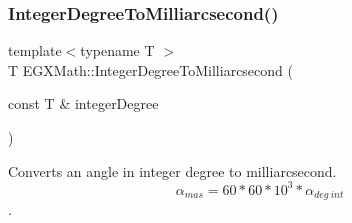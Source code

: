 \mbox{\label{group___e_g_x_math-_angle_conversions-_integer_degree_gadc43f22e832cd8fcf16b7bd2269ae348}} 
\subsubsection{\texorpdfstring{Integer\+Degree\+To\+Milliarcsecond()}{IntegerDegreeToMilliarcsecond()}}
{\footnotesize\ttfamily template$<$typename T $>$ \\
T E\+G\+X\+Math\+::\+Integer\+Degree\+To\+Milliarcsecond (\begin{DoxyParamCaption}\item[{const T \&}]{integer\+Degree }\end{DoxyParamCaption})}



Converts an angle in integer degree to milliarcsecond. \[\alpha_{mas}=60 * 60 * 10^3 * \alpha_{deg\ int} \]. 

